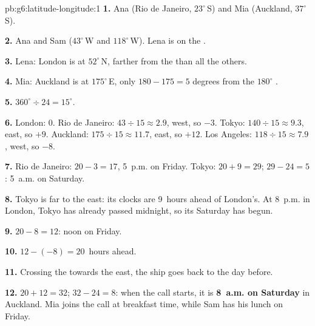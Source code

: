 \begin{solution}{pb:g6:latitude-longitude:1}
\textbf{1.} Ana (Rio de Janeiro, $23^\circ$\,S) and Mia (Auckland,
$37^\circ$\,S).

\textbf{2.} Ana and Sam ($43^\circ$\,W and $118^\circ$\,W). Lena is on the
.

\textbf{3.} Lena: London is at $52^\circ$\,N, farther from the 
than all the others.

\textbf{4.} Mia: Auckland is at $175^\circ$\,E, only $180 - 175 = 5$
degrees from the $180^\circ$ .

\textbf{5.} $360^\circ \div 24 = 15^\circ$.

\textbf{6.} London: $0$. Rio de Janeiro: $43 \div 15 \approx 2.9$, west,
so $-3$. Tokyo: $140 \div 15 \approx 9.3$, east, so $+9$. Auckland:
$175 \div 15 \approx 11.7$, east, so $+12$. Los Angeles:
$118 \div 15 \approx 7.9$, west, so $-8$.

\textbf{7.} Rio de Janeiro: $20 - 3 = 17$, 5~p.m. on Friday. Tokyo:
$20 + 9 = 29$; $29 - 24 = 5$: 5~a.m. on Saturday.

\textbf{8.} Tokyo is far to the east: its clocks are 9~hours ahead of
London's. At 8~p.m. in London, Tokyo has already passed midnight, so its
Saturday has begun.

\textbf{9.} $20 - 8 = 12$: noon on Friday.

\textbf{10.} $12 - (-8) = 20$~hours ahead.

\textbf{11.} Crossing the  towards the east, the ship goes back to
the day before.

\textbf{12.} $20 + 12 = 32$; $32 - 24 = 8$: when the call starts, it is
\textbf{8~a.m. on Saturday} in Auckland. Mia joins the call at breakfast
time, while Sam has his lunch on Friday.
\end{solution}
